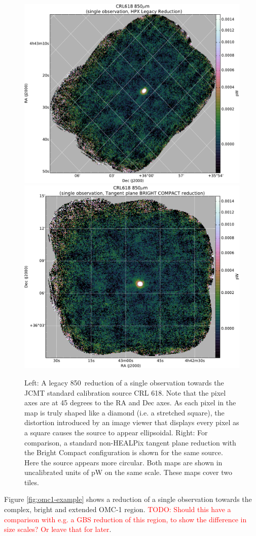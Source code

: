 \documentclass[usenatbib]{mnras}
\newcommand{\um}{\micron}
\newcommand{\todo}[1]{\textcolor{red}{TODO: #1}}
\begin{document}
\begin{figure}
  \centering
  \includegraphics[width=0.45\linewidth]{crl618_example_legacyred}
  \includegraphics[width=0.45\linewidth]{crl618_example_bcred}
  \caption{Left: A legacy 850\,\um{} reduction of a single observation
    towards the JCMT standard calibration source CRL 618. Note that
    the pixel axes are at 45 degrees to the RA and Dec axes. As each
    pixel in the map is truly shaped like a diamond (i.e. a stretched
    square), the distortion introduced by an image viewer that
    displays every pixel as a square causes the source to appear
    ellipsoidal. Right: For comparison, a standard non-HEALPix tangent
    plane reduction with the Bright Compact configuration is shown for
    the same source. Here the source appears more circular. Both maps
    are shown in uncalibrated units of pW on the same scale. These
    maps cover two tiles.}
  \label{fig:crl618-example}
\end{figure}


Figure \ref{fig:omc1-example} shows a reduction of a single
observation towards the complex, bright and extended OMC-1
region. \todo{ Should this have a comparison with e.g. a GBS
  reduction of this region, to show the difference in size scales? Or leave that for later}.
\end{document}
